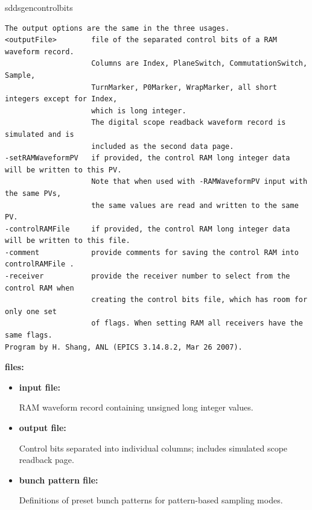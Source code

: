 \begin{sddsprog}{sddsgencontrolbits}
\begin{verbatim}
The output options are the same in the three usages.
<outputFile>        file of the separated control bits of a RAM waveform record.
                    Columns are Index, PlaneSwitch, CommutationSwitch, Sample,
                    TurnMarker, P0Marker, WrapMarker, all short integers except for Index,
                    which is long integer.
                    The digital scope readback waveform record is simulated and is
                    included as the second data page.
-setRAMWaveformPV   if provided, the control RAM long integer data will be written to this PV.
                    Note that when used with -RAMWaveformPV input with the same PVs,
                    the same values are read and written to the same PV.
-controlRAMFile     if provided, the control RAM long integer data will be written to this file.
-comment            provide comments for saving the control RAM into controlRAMFile .
-receiver           provide the receiver number to select from the control RAM when
                    creating the control bits file, which has room for only one set
                    of flags. When setting RAM all receivers have the same flags.
Program by H. Shang, ANL (EPICS 3.14.8.2, Mar 26 2007).

\end{verbatim}
\normalsize

\item \textbf{files:}
\begin{itemize}
  \item \textbf{input file:} \par
  RAM waveform record containing unsigned long integer values.
  \item \textbf{output file:} \par
  Control bits separated into individual columns; includes simulated scope readback page.
  \item \textbf{bunch pattern file:} \par
  Definitions of preset bunch patterns for pattern-based sampling modes.


\end{itemize}
\end{sddsprog}
